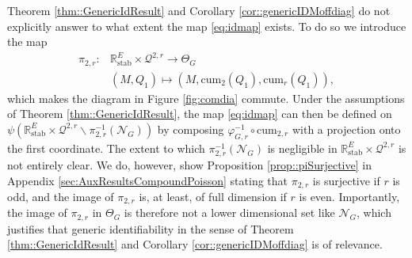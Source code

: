 \documentclass{biometrika}
\begin{document}

Theorem \ref{thm::GenericIdResult} and Corollary \ref{cor::genericIDMoffdiag} do 
not explicitly answer to what extent the map \eqref{eq:idmap} exists. To do so 
we introduce the map 
\begin{align*}
    \pi_{2,r} : & \mathbb{R}^E_{\mathrm{stab}} \times \mathcal{Q}^{2, r} \to 
    \Theta_G \\
    & (M, Q_1) \mapsto (M, \mathrm{cum}_2(Q_1), \mathrm{cum}_r(Q_1)),
\end{align*}
which makes the diagram in Figure \ref{fig:comdia} commute. Under the 
assumptions of Theorem \ref{thm::GenericIdResult}, the map \eqref{eq:idmap} can then be defined on $\psi(\mathbb{R}^E_{\mathrm{stab}} \times \mathcal{Q}^{2, r} \backslash \pi_{2,r}^{-1}(\mathcal{N}_G))$ by composing $\varphi_{G, r}^{-1} \circ \mathrm{cum}_{2,r}$ with a projection onto the first coordinate. The extent to 
which $\pi_{2,r}^{-1}(\mathcal{N}_G)$ is negligible in 
$\mathbb{R}^E_{\mathrm{stab}} \times \mathcal{Q}^{2, r}$ is not entirely clear. 
We do, however, show Proposition \ref{prop::piSurjective} in 
Appendix \ref{sec:AuxResultsCompoundPoisson} stating that $\pi_{2,r}$ is 
surjective if $r$ is odd, and the image of $\pi_{2,r}$ is, at least, of 
full dimension if $r$ is even. Importantly, the image of $\pi_{2,r}$ in 
$\Theta_G$ is therefore not a lower dimensional set like $\mathcal{N}_G$, 
which justifies that generic identifiability in the sense of 
Theorem \ref{thm::GenericIdResult} and Corollary \ref{cor::genericIDMoffdiag}
is of relevance.
\end{document}
